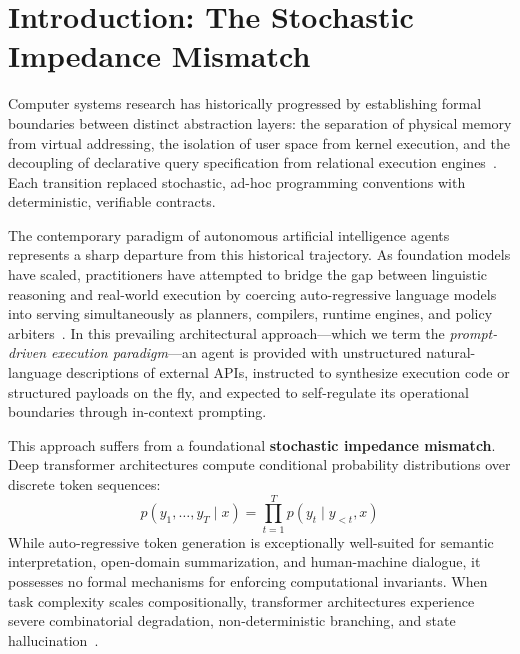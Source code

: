 
\section{Introduction: The Stochastic Impedance Mismatch}
\label{sec:introduction}

Computer systems research has historically progressed by establishing formal boundaries between distinct abstraction layers: the separation of physical memory from virtual addressing, the isolation of user space from kernel execution, and the decoupling of declarative query specification from relational execution engines~\cite{saltzer1975protection, lampson1974protection, parnas1972criteria, hoare1969axiomatic}. Each transition replaced stochastic, ad-hoc programming conventions with deterministic, verifiable contracts.

The contemporary paradigm of autonomous artificial intelligence agents represents a sharp departure from this historical trajectory. As foundation models have scaled, practitioners have attempted to bridge the gap between linguistic reasoning and real-world execution by coercing auto-regressive language models into serving simultaneously as planners, compilers, runtime engines, and policy arbiters~\cite{wang2024survey, xi2023rise, yao2023react, schick2023toolformer}. In this prevailing architectural approach---which we term the \emph{prompt-driven execution paradigm}---an agent is provided with unstructured natural-language descriptions of external APIs, instructed to synthesize execution code or structured payloads on the fly, and expected to self-regulate its operational boundaries through in-context prompting.

This approach suffers from a foundational \textbf{stochastic impedance mismatch}. Deep transformer architectures compute conditional probability distributions over discrete token sequences:
\begin{equation}
\label{eq:autoregressive}
p(y_1, \dots, y_T \mid x) = \prod_{t=1}^T p(y_t \mid y_{<t}, x)
\end{equation}
While auto-regressive token generation is exceptionally well-suited for semantic interpretation, open-domain summarization, and human-machine dialogue, it possesses no formal mechanisms for enforcing computational invariants. When task complexity scales compositionally, transformer architectures experience severe combinatorial degradation, non-deterministic branching, and state hallucination~\cite{dziri2023faith, valmeekam2023planning, ji2023survey, huang2023survey}.

